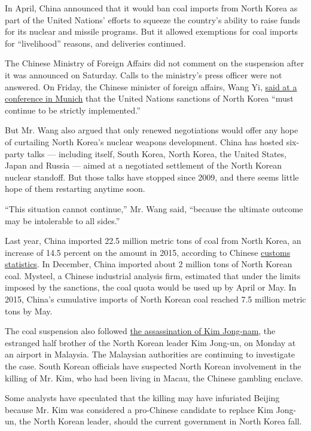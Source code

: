 In April, China announced that it would ban coal imports from North
Korea as part of the United Nations' efforts to squeeze the country's
ability to raise funds for its nuclear and missile programs. But it
allowed exemptions for coal imports for ``livelihood'' reasons, and
deliveries continued.

The Chinese Ministry of Foreign Affairs did not comment on the
suspension after it was announced on Saturday. Calls to the ministry's
press officer were not answered. On Friday, the Chinese minister of
foreign affairs, Wang Yi,
\href{http://www.mfa.gov.cn/web/zyxw/t1439593.shtml}{said at a
conference in Munich} that the United Nations sanctions of North Korea
``must continue to be strictly implemented.''

But Mr. Wang also argued that only renewed negotiations would offer any
hope of curtailing North Korea's nuclear weapons development. China has
hosted six-party talks --- including itself, South Korea, North Korea,
the United States, Japan and Russia --- aimed at a negotiated settlement
of the North Korean nuclear standoff. But those talks have stopped since
2009, and there seems little hope of them restarting anytime soon.

``This situation cannot continue,'' Mr. Wang said, ``because the
ultimate outcome may be intolerable to all sides.''

Last year, China imported 22.5 million metric tons of coal from North
Korea, an increase of 14.5 percent on the amount in 2015, according to
Chinese \href{http://www.sxcoal.com/news/4551922/info}{customs
statistics}. In December, China imported about 2 million tons of North
Korean coal. Mysteel, a Chinese industrial analysis firm, estimated that
under the limits imposed by the sanctions, the coal quota would be used
up by April or May. In 2015, China's cumulative imports of North Korean
coal reached 7.5 million metric tons by May.

The coal suspension also followed
\href{https://www.nytimes3xbfgragh.onion/2017/02/14/world/asia/kim-jong-un-brother-killed-malaysia.html}{the
assassination of Kim Jong-nam}, the estranged half brother of the North
Korean leader Kim Jong-un, on Monday at an airport in Malaysia. The
Malaysian authorities are continuing to investigate the case. South
Korean officials have suspected North Korean involvement in the killing
of Mr. Kim, who had been living in Macau, the Chinese gambling enclave.

Some analysts have speculated that the killing may have infuriated
Beijing because Mr. Kim was considered a pro-Chinese candidate to
replace Kim Jong-un, the North Korean leader, should the current
government in North Korea fall.

